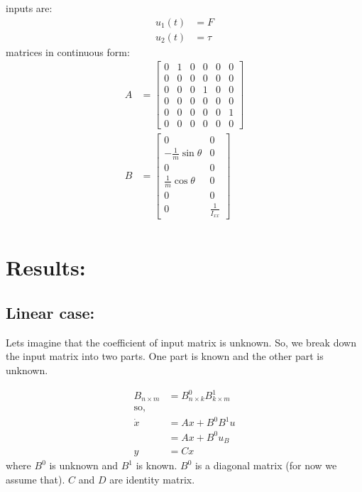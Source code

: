 \documentclass[12pt]{article}
\begin{document}
inputs are:
\begin{align*}
    u_1(t) &= F \\
    u_2(t) &= \tau
\end{align*}
matrices in continuous form:
\begin{align*}
    A &= \begin{bmatrix}
        0 & 1 & 0 & 0 & 0 & 0 \\
        0 & 0 & 0 & 0 & 0 & 0 \\
        0 & 0 & 0 & 1 & 0 & 0 \\
        0 & 0 & 0 & 0 & 0 & 0 \\
        0 & 0 & 0 & 0 & 0 & 1 \\
        0 & 0 & 0 & 0 & 0 & 0
    \end{bmatrix} \\
    B &= \begin{bmatrix}
        0 & 0 \\
        - \frac{1}{m} \sin{\theta} & 0 \\
        0 & 0 \\
        \frac{1}{m} \cos{\theta} & 0 \\
        0 & 0 \\
        0 & \frac{1}{I_{xx}}
    \end{bmatrix} \\
\end{align*}

\section*{Results:}

\subsection*{Linear case:}

Lets imagine that the coefficient of input matrix is unknown. So, we break down the input matrix into two parts. One part is known and the other part is unknown.

\begin{align*}
    B_{n \times m} &= B^{0}_{n \times k} B^{1}_{k \times m} \\ 
    \text{so,}  \\
    \dot{x} &= Ax + B^{0} B^{1} u \\
    &= Ax + B^{0} u_{B} \\
    y &= Cx 
\end{align*}
where $B^{0}$ is unknown and $B^{1}$ is known. $B^{0}$ is a diagonal matrix (for now we assume that). $C$ and $D$ are identity matrix.
\end{document}
